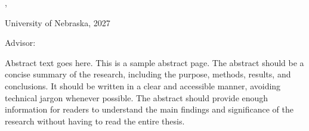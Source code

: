 \clearpage
\begin{center}
    \vspace*{0.8in}
    {\large \ThesisTitle\par}
    \vspace{0.2in}
    \AuthorName, \DegreeNameAbr\par
    \vspace{0.15in}
    University of Nebraska, 2027\par
    \vspace{0.15in}
    Advisor: \AdvisorName\par
    \vspace{0.9in}
\end{center}
Abstract text goes here. This is a sample abstract page. The abstract should be a concise summary of the research, including the purpose, methods, results, and conclusions. It should be written in a clear and accessible manner, avoiding technical jargon whenever possible. The abstract should provide enough information for readers to understand the main findings and significance of the research without having to read the entire thesis.